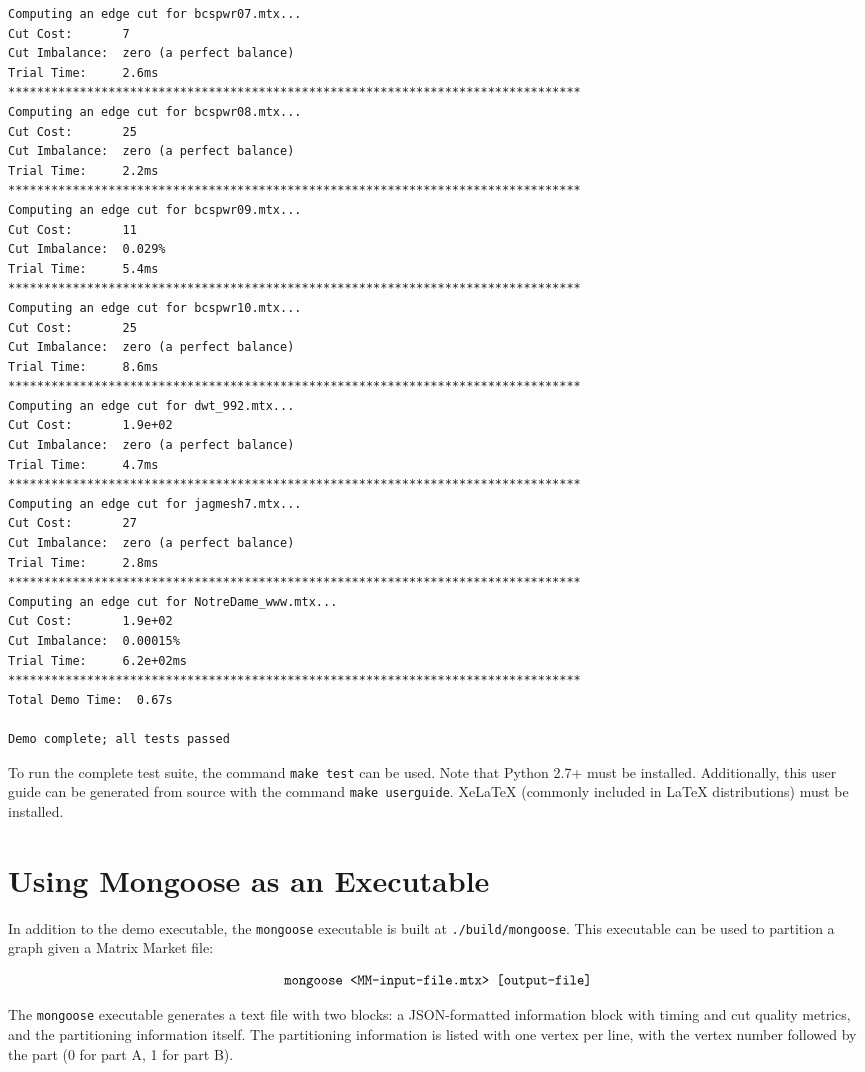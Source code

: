 \documentclass[letter]{article}
\begin{document}
\begin{lstlisting}[numbers=none,xleftmargin=.09\textwidth, xrightmargin=.09\textwidth,keywordstyle=\color{black}]
Computing an edge cut for bcspwr07.mtx...
Cut Cost:       7
Cut Imbalance:  zero (a perfect balance)
Trial Time:     2.6ms
********************************************************************************
Computing an edge cut for bcspwr08.mtx...
Cut Cost:       25
Cut Imbalance:  zero (a perfect balance)
Trial Time:     2.2ms
********************************************************************************
Computing an edge cut for bcspwr09.mtx...
Cut Cost:       11
Cut Imbalance:  0.029%
Trial Time:     5.4ms
********************************************************************************
Computing an edge cut for bcspwr10.mtx...
Cut Cost:       25
Cut Imbalance:  zero (a perfect balance)
Trial Time:     8.6ms
********************************************************************************
Computing an edge cut for dwt_992.mtx...
Cut Cost:       1.9e+02
Cut Imbalance:  zero (a perfect balance)
Trial Time:     4.7ms
********************************************************************************
Computing an edge cut for jagmesh7.mtx...
Cut Cost:       27
Cut Imbalance:  zero (a perfect balance)
Trial Time:     2.8ms
********************************************************************************
Computing an edge cut for NotreDame_www.mtx...
Cut Cost:       1.9e+02
Cut Imbalance:  0.00015%
Trial Time:     6.2e+02ms
********************************************************************************
Total Demo Time:  0.67s

Demo complete; all tests passed
\end{lstlisting}

To run the complete test suite, the command \texttt{make test} can be used. Note that Python 2.7+ must be installed. Additionally, this user guide can be generated from source with the command \texttt{make userguide}. XeLaTeX (commonly included in LaTeX distributions) must be installed.

\section{Using Mongoose as an Executable}

In addition to the demo executable, the \texttt{mongoose} executable is built at \texttt{./build/mongoose}. This executable can be used to partition a graph given a Matrix Market file:

\[\text{\texttt{mongoose <MM-input-file.mtx> [output-file]}}\]

The \texttt{mongoose} executable generates a text file with two blocks: a JSON-formatted information block with timing and cut quality metrics, and the partitioning information itself. The partitioning information is listed with one vertex per line, with the vertex number followed by the part (0 for part A, 1 for part B).\\
\end{document}
